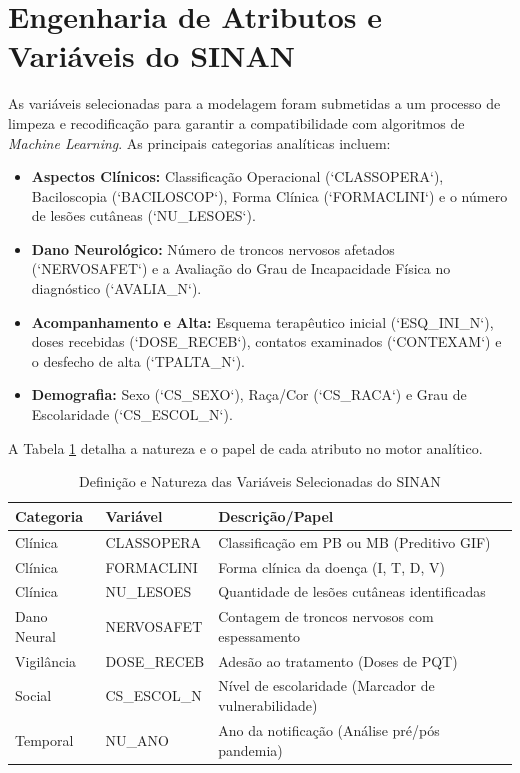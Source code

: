 \section{Engenharia de Atributos e Variáveis do SINAN}

As variáveis selecionadas para a modelagem foram submetidas a um processo de limpeza e recodificação para garantir a compatibilidade com algoritmos de \textit{Machine Learning}. As principais categorias analíticas incluem:

\begin{itemize}
    \item \textbf{Aspectos Clínicos:} Classificação Operacional (`CLASSOPERA`), Baciloscopia (`BACILOSCOP`), Forma Clínica (`FORMACLINI`) e o número de lesões cutâneas (`NU\_LESOES`).
    \item \textbf{Dano Neurológico:} Número de troncos nervosos afetados (`NERVOSAFET`) e a Avaliação do Grau de Incapacidade Física no diagnóstico (`AVALIA\_N`).
    \item \textbf{Acompanhamento e Alta:} Esquema terapêutico inicial (`ESQ\_INI\_N`), doses recebidas (`DOSE\_RECEB`), contatos examinados (`CONTEXAM`) e o desfecho de alta (`TPALTA\_N`).
    \item \textbf{Demografia:} Sexo (`CS\_SEXO`), Raça/Cor (`CS\_RACA`) e Grau de Escolaridade (`CS\_ESCOL\_N`).
\end{itemize}

A Tabela \ref{tab:variaveis_selecionadas} detalha a natureza e o papel de cada atributo no motor analítico.

\begin{table}[H]
\centering
\caption{Definição e Natureza das Variáveis Selecionadas do SINAN}
\label{tab:variaveis_selecionadas}
\begin{tabular}{lll}
\toprule
Categoria & Variável & Descrição/Papel \\
\midrule
Clínica & CLASSOPERA & Classificação em PB ou MB (Preditivo GIF) \\
Clínica & FORMACLINI & Forma clínica da doença (I, T, D, V) \\
Clínica & NU\_LESOES & Quantidade de lesões cutâneas identificadas \\
Dano Neural & NERVOSAFET & Contagem de troncos nervosos com espessamento \\
Vigilância & DOSE\_RECEB & Adesão ao tratamento (Doses de PQT) \\
Social & CS\_ESCOL\_N & Nível de escolaridade (Marcador de vulnerabilidade) \\
Temporal & NU\_ANO & Ano da notificação (Análise pré/pós pandemia) \\
\bottomrule
\end{tabular}
\end{table}

